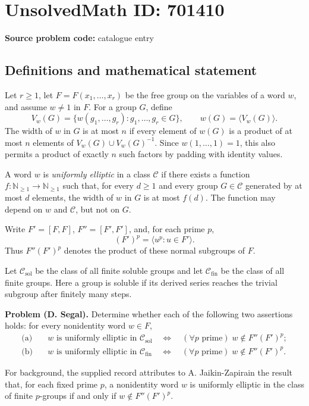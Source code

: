 \documentclass[11pt]{article}
\newcommand{\N}{\mathbb{N}}
\begin{document}
\section*{UnsolvedMath ID: 701410}
\textbf{Source problem code:} catalogue entry
\subsection{Definitions and mathematical statement}
Let \(r\geq 1\), let \(F=F(x_1,\ldots,x_r)\) be the free group on the variables of a word \(w\), and assume \(w\neq 1\) in \(F\). For a group \(G\), define
\[
V_w(G)=\{w(g_1,\ldots,g_r):g_1,\ldots,g_r\in G\},
\qquad w(G)=\langle V_w(G)\rangle.
\]
The width of \(w\) in \(G\) is at most \(n\) if every element of \(w(G)\) is a product of at most \(n\) elements of \(V_w(G)\cup V_w(G)^{-1}\). Since \(w(1,\ldots,1)=1\), this also permits a product of exactly \(n\) such factors by padding with identity values.

A word \(w\) is \emph{uniformly elliptic} in a class \(\mathcal C\) if there exists a function \(f:\N_{\geq 1}\to\N_{\geq 1}\) such that, for every \(d\geq 1\) and every group \(G\in\mathcal C\) generated by at most \(d\) elements, the width of \(w\) in \(G\) is at most \(f(d)\). The function may depend on \(w\) and \(\mathcal C\), but not on \(G\).

Write \(F'=[F,F]\), \(F''=[F',F']\), and, for each prime \(p\),
\[
(F')^p=\langle u^p:u\in F'\rangle.
\]
Thus \(F''(F')^p\) denotes the product of these normal subgroups of \(F\).

Let \(\mathcal C_{\mathrm{sol}}\) be the class of all finite soluble groups and let \(\mathcal C_{\mathrm{fin}}\) be the class of all finite groups. Here a group is soluble if its derived series reaches the trivial subgroup after finitely many steps.

\textbf{Problem (D. Segal).} Determine whether each of the following two assertions holds: for every nonidentity word \(w\in F\),
\[
\begin{aligned}
\text{(a)}\quad &w\text{ is uniformly elliptic in }\mathcal C_{\mathrm{sol}}
\quad\Longleftrightarrow\quad
(\forall p\text{ prime})\;w\notin F''(F')^p;\\
\text{(b)}\quad &w\text{ is uniformly elliptic in }\mathcal C_{\mathrm{fin}}
\quad\Longleftrightarrow\quad
(\forall p\text{ prime})\;w\notin F''(F')^p.
\end{aligned}
\]

For background, the supplied record attributes to A. Jaikin-Zapirain the result that, for each fixed prime \(p\), a nonidentity word \(w\) is uniformly elliptic in the class of finite \(p\)-groups if and only if \(w\notin F''(F')^p\).
\end{document}
